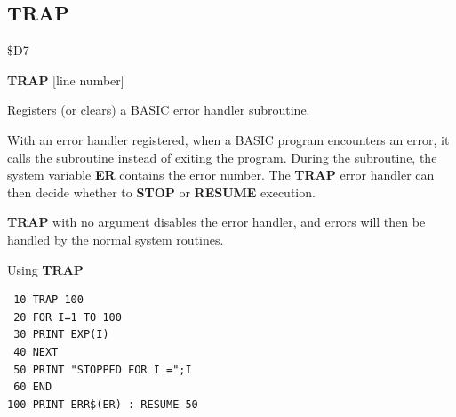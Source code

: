 \subsection{TRAP}
\begin{description}[leftmargin=2cm,style=nextline]
\item [Token:]    \$D7

\item [Format:]   {\bf TRAP} [line number]

\item [Usage:]    Registers (or clears) a BASIC error handler subroutine.

                  With an error handler registered, when a BASIC program encounters an error, it calls the subroutine instead of exiting the program. During the subroutine, the system variable {\bf ER} contains the error number. The {\bf TRAP} error handler can then decide whether to {\bf STOP} or {\bf RESUME} execution.

                  {\bf TRAP} with no argument disables the error handler, and errors will then be handled by the normal system routines.

\item [Example:]  Using {\bf TRAP}

\begin{tcolorbox}[colback=black,coltext=white]
\verbatimfont{\codefont}
\begin{verbatim}
 10 TRAP 100
 20 FOR I=1 TO 100
 30 PRINT EXP(I)
 40 NEXT
 50 PRINT "STOPPED FOR I =";I
 60 END
100 PRINT ERR$(ER) : RESUME 50
\end{verbatim}
\end{tcolorbox}
\end{description}


\newpage
